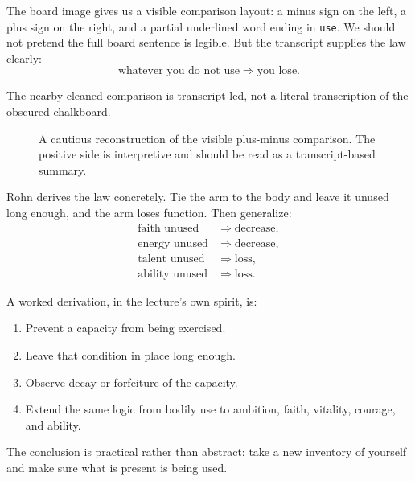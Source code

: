The board image gives us a visible comparison layout: a minus sign on the left, a plus sign on the right, and a partial underlined word ending in \texttt{use}. We should not pretend the full board sentence is legible. But the transcript supplies the law clearly:
\begin{equation}
\text{whatever you do not use} \Rightarrow \text{you lose}.
\end{equation}

\begin{remark}
The nearby cleaned comparison is transcript-led, not a literal transcription of the obscured chalkboard.
\end{remark}

\begin{figure}[h]
\centering
{}
\caption{A cautious reconstruction of the visible plus-minus comparison. The positive side is interpretive and should be read as a transcript-based summary.}
\end{figure}

Rohn derives the law concretely. Tie the arm to the body and leave it unused long enough, and the arm loses function. Then generalize:
\begin{align}
\text{faith unused} &\Rightarrow \text{decrease},\\
\text{energy unused} &\Rightarrow \text{decrease},\\
\text{talent unused} &\Rightarrow \text{loss},\\
\text{ability unused} &\Rightarrow \text{loss}.
\end{align}

A worked derivation, in the lecture's own spirit, is:
\begin{enumerate}
\item Prevent a capacity from being exercised.
\item Leave that condition in place long enough.
\item Observe decay or forfeiture of the capacity.
\item Extend the same logic from bodily use to ambition, faith, vitality, courage, and ability.
\end{enumerate}
The conclusion is practical rather than abstract: take a new inventory of yourself and make sure what is present is being used.

